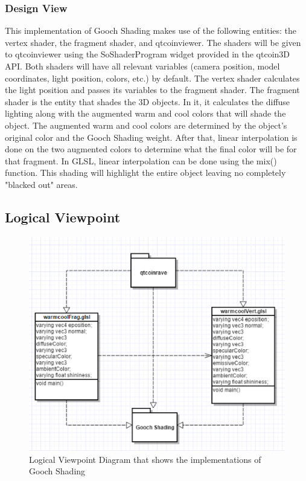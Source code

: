\documentclass[10pt,journal,compsoc,draftclsnofoot]{IEEEtran}
\begin{document}
\begin{flushleft}
\subsubsection{Design View}
This implementation of Gooch Shading makes use of the following entities: the vertex shader, the fragment shader, and qtcoinviewer.
The shaders will be given to qtcoinviewer using the SoShaderProgram widget provided in the qtcoin3D API.
Both shaders will have all relevant variables (camera position, model coordinates, light position, colors, etc.) by default.
The vertex shader calculates the light position and passes its variables to the fragment shader.
The fragment shader is the entity that shades the 3D objects.
In it, it calculates the diffuse lighting along with the augmented warm and cool colors that will shade the object.
The augmented warm and cool colors are determined by the object's original color and the Gooch Shading weight.
After that, linear interpolation is done on the two augmented colors to determine what the final color will be for that fragment.
In GLSL, linear interpolation can be done using the mix() function.
This shading will highlight the entire object leaving no completely "blacked out" areas.

\newpage

\subsection{Logical Viewpoint}

\begin{figure} [H]
  \includegraphics[scale=0.8]{Gooch_Shading_composition.eps}
  \caption
{ \newline \hspace{\linewidth}
Logical Viewpoint Diagram that shows the implementations of Gooch Shading}
  \label{fig:Gooch_Shading_composition}
\end{figure}


\end{flushleft}
\end{document}
